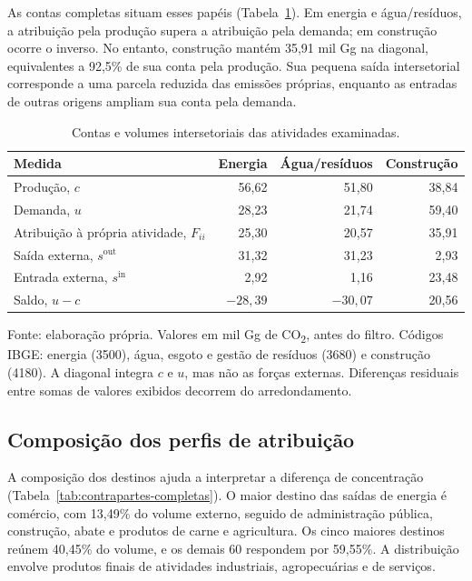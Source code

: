 As contas completas situam esses papéis (Tabela~\ref{tab:contas-energia-construcao}). Em energia e água/resíduos, a atribuição pela produção supera a atribuição pela demanda; em construção ocorre o inverso. No entanto, construção mantém 35,91 mil Gg na diagonal, equivalentes a 92,5\% de sua conta pela produção. Sua pequena saída intersetorial corresponde a uma parcela reduzida das emissões próprias, enquanto as entradas de outras origens ampliam sua conta pela demanda.

\begin{table}[!ht]
\centering
\caption{Contas e volumes intersetoriais das atividades examinadas.}
\label{tab:contas-energia-construcao}
\small
\begin{tabular}{@{}lrrr@{}}
\toprule
Medida & Energia & Água/resíduos & Construção \\
\midrule
Produção, $c$ & 56,62 & 51,80 & 38,84 \\
Demanda, $u$ & 28,23 & 21,74 & 59,40 \\
Atribuição à própria atividade, $F_{ii}$ & 25,30 & 20,57 & 35,91 \\
Saída externa, $s^{\mathrm{out}}$ & 31,32 & 31,23 & 2,93 \\
Entrada externa, $s^{\mathrm{in}}$ & 2,92 & 1,16 & 23,48 \\
Saldo, $u-c$ & $-28,39$ & $-30,07$ & 20,56 \\
\bottomrule
\end{tabular}
\par\smallskip\begin{minipage}{\textwidth}\footnotesize
Fonte: elaboração própria. Valores em mil Gg de CO\textsubscript{2}, antes do filtro. Códigos IBGE: energia (3500), água, esgoto e gestão de resíduos (3680) e construção (4180). A diagonal integra $c$ e $u$, mas não as forças externas. Diferenças residuais entre somas de valores exibidos decorrem do arredondamento.
\end{minipage}
\end{table}



\subsection{Composição dos perfis de atribuição}
\label{sec:composicao-perfis}

A composição dos destinos ajuda a interpretar a diferença de concentração (Tabela~\ref{tab:contrapartes-completas}). O maior destino das saídas de energia é comércio, com 13,49\% do volume externo, seguido de administração pública, construção, abate e produtos de carne e agricultura. Os cinco maiores destinos reúnem 40,45\% do volume, e os demais 60 respondem por 59,55\%. A distribuição envolve produtos finais de atividades industriais, agropecuárias e de serviços.


